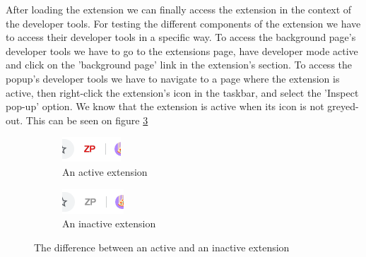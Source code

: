 \documentclass[12pt,a4paper,twoside]{report}
\begin{document}
After loading the extension we can finally access the extension in the context of the developer tools. For testing the different components of the extension we have to access their developer tools in a specific way. To access the background page's developer tools we have to go to the extensions page, have developer mode active and click on the 'background page' link in the extension's section. To access the popup's developer tools we have to navigate to a page where the extension is active, then right-click the extension's icon in the taskbar, and select the 'Inspect pop-up' option. We know that the extension is active when its icon is not greyed-out. This can be seen on figure \ref{mfig:active_and_inactive_extension}

\begin{figure}[ht]
  \centering
  \begin{subfigure}{0.4\textwidth}
    \centering
    \includegraphics[width=0.5\linewidth]{img/active_extension_icon.png}
    \caption[]{An active extension}
    \label{fig:active_extension}
  \end{subfigure}
  \begin{subfigure}{0.4\textwidth}
    \centering
    \includegraphics[width=0.5\linewidth]{img/inactive_extension_icon.png}
    \caption[]{An inactive extension}
    \label{fig:inactive_extension}
  \end{subfigure}
  \caption{The difference between an active and an inactive extension}
  \label{mfig:active_and_inactive_extension}
\end{figure}
\end{document}
